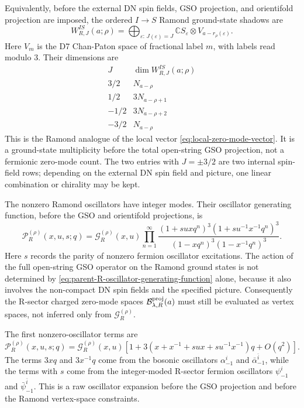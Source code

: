 \documentclass[11pt]{article}
\newcommand{\C}{\mathbb{C}}
\begin{document}
Equivalently, before the external DN spin fields, GSO projection, and orientifold projection
are imposed, the ordered \(I\to S\) Ramond ground-state shadows are
\begin{equation}
  W_{R,J}^{IS}(a;\rho)
  =
  \bigoplus_{\varepsilon:\,J(\varepsilon)=J}
  \C S_\varepsilon\otimes V_{a-r_\rho(\varepsilon)} .
  \label{eq:R-ground-state-ordered-spaces}
\end{equation}
Here \(V_m\) is the D7 Chan-Paton space of fractional label \(m\), with labels read modulo
\(3\). Their dimensions are
\begin{equation}
  \begin{array}{c|c}
  J & \dim W_{R,J}^{IS}(a;\rho) \\
  \hline
  3/2 & N_{a-\rho} \\
  1/2 & 3N_{a-\rho+1} \\
  -1/2 & 3N_{a-\rho+2} \\
  -3/2 & N_{a-\rho}
  \end{array}
  \label{eq:R-ground-state-local-vector}
\end{equation}
This is the Ramond analogue of the local vector \eqref{eq:local-zero-mode-vector}. It is a
ground-state multiplicity before the total open-string GSO projection, not a fermionic
zero-mode count. The two entries with \(J=\pm3/2\) are two internal spin-field rows; depending
on the external DN spin field and picture, one linear combination or chirality may be kept.

The nonzero Ramond oscillators have integer modes. Their oscillator generating function, before
the GSO and orientifold projections, is
\begin{equation}
  \mathcal P_R^{(\rho)}(x,u,s;q)
  =
  \mathcal G_R^{(\rho)}(x,u)
  \prod_{n=1}^{\infty}
  \frac{(1+suxq^n)^3(1+su^{-1}x^{-1}q^n)^3}
       {(1-xq^n)^3(1-x^{-1}q^n)^3}.
  \label{eq:parent-R-oscillator-generating-function}
\end{equation}
Here \(s\) records the parity of nonzero fermion oscillator excitations. The action of the full
open-string GSO operator on the Ramond ground states is not determined by
\eqref{eq:parent-R-oscillator-generating-function} alone, because it also involves the
non-compact DN spin fields and the specified picture. Consequently the R-sector charged
zero-mode spaces \(\mathcal B_{\lambda,R}^{\rm proj}(a)\) must still be evaluated as vertex
spaces, not inferred only from \(\mathcal G_R^{(\rho)}\).

The first nonzero-oscillator terms are
\begin{equation}
  \mathcal P_R^{(\rho)}(x,u,s;q)
  =
  \mathcal G_R^{(\rho)}(x,u)
  \left[
    1+
    3\left(x+x^{-1}+sux+su^{-1}x^{-1}\right)q
    +O(q^2)
  \right].
  \label{eq:parent-R-first-oscillator-terms}
\end{equation}
The terms \(3xq\) and \(3x^{-1}q\) come from the bosonic oscillators
\(\alpha^i_{-1}\) and \(\bar\alpha^{\bar i}_{-1}\), while the terms with \(s\) come from the
integer-moded R-sector fermion oscillators \(\psi^i_{-1}\) and
\(\bar\psi^{\bar i}_{-1}\). This is a raw oscillator expansion before the GSO projection and
before the Ramond vertex-space constraints.
\end{document}
